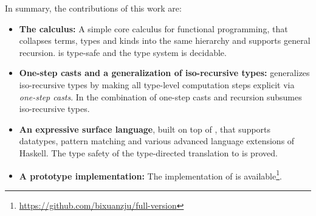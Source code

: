 In summary, the contributions of this work are:

\begin{itemize}
\item {\bf The \name calculus:} A simple core calculus for functional programming, that collapses terms, types and
  kinds into the same hierarchy and supports general recursion. \name
  is type-safe and the type system is decidable.

\item {\bf One-step casts and a generalization of iso-recursive types:} \name 
 generalizes iso-recursive types by making all type-level computation
 steps explicit via \emph{one-step casts}. In \name the combination of
  one-step casts and recursion subsumes iso-recursive types.

\item {\bf An expressive surface language}, built on top of \name,
  that supports datatypes, pattern matching and various advanced
  language extensions of Haskell. The type safety of the type-directed
  translation to \name is proved.

\item {\bf A prototype implementation:} The implementation of \name is
  available\footnote{\url{https://github.com/bixuanzju/full-version}}.
\end{itemize}

